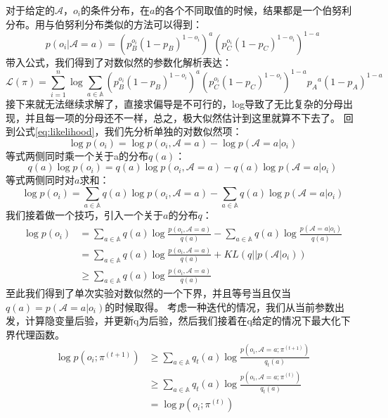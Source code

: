 \documentclass[12pt,a4paper]{article}
\begin{document}
对于给定的$\mathcal{A}$，$o_i$的条件分布，在$a$的各个不同取值的时候，结果都是一个伯努利分布。用与伯努利分布类似的方法可以得到：
\begin{equation}\label{eq:conditional}
    p(o_i|\mathcal{A}=a)=(p_B^{o_i}(1-p_B)^{1-o_i})^a(p_C^{o_i}(1-p_C)^{1-o_i})^{1-a}
\end{equation}
带入公式，我们得到了对数似然的参数化解析表达：
\begin{equation}
    \mathcal{L}(\pi)=\sum_{i=1}^n \log \sum_{a \in \mathbb{A}}(p_B^{o_i}(1-p_B)^{1-o_i})^a(p_C^{o_i}(1-p_C)^{1-o_i})^{1-a}{p_A}^a{(1-p_A)^{1-a}}
\end{equation}
接下来就无法继续求解了，直接求偏导是不可行的，log导致了无比复杂的分母出现，并且每一项的分母还不一样，总之，极大似然估计到这里就算不下去了。
回到公式\ref{eq:likelihood}，我们先分析单独的对数似然项：
\begin{equation}
     \log p(o_i)=\log p(o_i,\mathcal{A}=a)-\log p(\mathcal{A}=a|o_i)
\end{equation}
等式两侧同时乘一个关于a的分布$q(a)$：
\begin{equation}
    q(a)\log p(o_i)=q(a)\log p(o_i,\mathcal{A}=a)-q(a)\log p(\mathcal{A}=a|o_i)
\end{equation}
等式两侧同时对$a$求和：
\begin{equation}
\log p(o_i)=\sum_{a \in \mathbb{A}}q(a)\log p(o_i,\mathcal{A}=a)-\sum_{a \in \mathbb{A}}q(a)\log p(\mathcal{A}=a|o_i)
\end{equation}
我们接着做一个技巧，引入一个关于$a$的分布$q$：
\begin{equation}\label{eq:lower_bound}
    \begin{split}
\log p(o_i)&=\sum_{a \in \mathbb{A}}q(a)\log \frac{p(o_i,\mathcal{A}=a)}{q(a)}-\sum_{a \in \mathbb{A}}q(a)\log \frac{p(\mathcal{A}=a|o_i)}{q(a)}\\
&=\sum_{a \in \mathbb{A}}q(a)\log \frac{p(o_i,\mathcal{A}=a)}{q(a)}+KL(q||p(\mathcal{A}|o_i))\\
&\geq \sum_{a \in \mathbb{A}}q(a)\log \frac{p(o_i,\mathcal{A}=a)}{q(a)}
\end{split}
\end{equation}
至此我们得到了单次实验对数似然的一个下界，并且等号当且仅当$q(a)=p(\mathcal{A}=a|o_i)$的时候取得。
考虑一种迭代的情况，我们从当前参数出发，计算隐变量后验，并更新q为后验，然后我们接着在q给定的情况下最大化下界代理函数。
\begin{equation}
\begin{split}
\log p(o_i;\pi^{(t+1)}) &\geq \sum_{a \in \mathbb{A}}q_t(a)\log \frac{p(o_i,\mathcal{A}=a;\pi^{(t+1)})}{q_t(a)} \\
&\geq \sum_{a \in \mathbb{A}}q_t(a)\log \frac{p(o_i,\mathcal{A}=a;\pi^{(t)})}{q_t(a)} \\
&= \log p(o_i;\pi^{(t)})
\end{split}
\end{equation}
\end{document}
